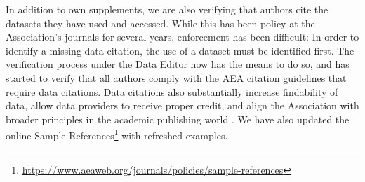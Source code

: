 \documentclass[PP]{AEA}
\newcommand{\urlcite}[2]{#2\footnote{\url{#1}}}
\begin{document}
In addition to own supplements, we are also verifying that authors cite the datasets they have used and accessed. While this has been policy at the Association's journals for several years, enforcement has been difficult: In order to identify a missing data citation, the use of a dataset must be identified first. The verification process under the Data Editor now has the means to do so, and has started to verify that all authors comply with the AEA citation guidelines that require data citations. Data citations also substantially increase findability of data, allow data providers to receive proper credit, and align the Association with broader principles in the academic publishing world \citep{Altman2013-fl,dataone-cite,jddcp,CousijnSci.Data2018}. We have also updated the online  \urlcite{https://www.aeaweb.org/journals/policies/sample-references}{Sample References} with refreshed examples.
\end{document}
